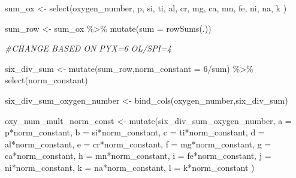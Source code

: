 \documentclass[
]{article}
\newenvironment{Shaded}{\begin{snugshade}}{\end{snugshade}}
\newcommand{\AttributeTok}[1]{\textcolor[rgb]{0.77,0.63,0.00}{#1}}
\newcommand{\CommentTok}[1]{\textcolor[rgb]{0.56,0.35,0.01}{\textit{#1}}}
\newcommand{\DecValTok}[1]{\textcolor[rgb]{0.00,0.00,0.81}{#1}}
\newcommand{\FunctionTok}[1]{\textcolor[rgb]{0.00,0.00,0.00}{#1}}
\newcommand{\NormalTok}[1]{#1}
\newcommand{\OtherTok}[1]{\textcolor[rgb]{0.56,0.35,0.01}{#1}}
\newcommand{\SpecialCharTok}[1]{\textcolor[rgb]{0.00,0.00,0.00}{#1}}
\begin{document}
\begin{Shaded}
\begin{Highlighting}[]
\NormalTok{sum\_ox }\OtherTok{\textless{}{-}} \FunctionTok{select}\NormalTok{(oxygen\_number, p,}
\NormalTok{                   si,}
\NormalTok{                   ti,}
\NormalTok{                   al,}
\NormalTok{                   cr,}
\NormalTok{                   mg,}
\NormalTok{                   ca,}
\NormalTok{                   mn,}
\NormalTok{                   fe,}
\NormalTok{                   ni,}
\NormalTok{                   na,}
\NormalTok{                   k}
\NormalTok{                   )}

\NormalTok{sum\_row }\OtherTok{\textless{}{-}}\NormalTok{ sum\_ox }\SpecialCharTok{\%\textgreater{}\%} 
  \FunctionTok{mutate}\NormalTok{(}\AttributeTok{sum =} \FunctionTok{rowSums}\NormalTok{(.))}

\CommentTok{\#CHANGE BASED ON PYX=6 OL/SPI=4}

\NormalTok{six\_div\_sum }\OtherTok{\textless{}{-}} \FunctionTok{mutate}\NormalTok{(sum\_row,}\AttributeTok{norm\_constant =} \DecValTok{6}\SpecialCharTok{/}\NormalTok{sum) }\SpecialCharTok{\%\textgreater{}\%} 
  \FunctionTok{select}\NormalTok{(norm\_constant)}

\NormalTok{six\_div\_sum\_oxygen\_number }\OtherTok{\textless{}{-}} \FunctionTok{bind\_cols}\NormalTok{(oxygen\_number,six\_div\_sum)}

\NormalTok{oxy\_num\_mult\_norm\_const }\OtherTok{\textless{}{-}} \FunctionTok{mutate}\NormalTok{(six\_div\_sum\_oxygen\_number, }\AttributeTok{a =}\NormalTok{ p}\SpecialCharTok{*}\NormalTok{norm\_constant,}
                                  \AttributeTok{b =}\NormalTok{ si}\SpecialCharTok{*}\NormalTok{norm\_constant,}
                                  \AttributeTok{c =}\NormalTok{ ti}\SpecialCharTok{*}\NormalTok{norm\_constant,}
                                  \AttributeTok{d =}\NormalTok{ al}\SpecialCharTok{*}\NormalTok{norm\_constant,}
                                  \AttributeTok{e =}\NormalTok{ cr}\SpecialCharTok{*}\NormalTok{norm\_constant,}
                                  \AttributeTok{f =}\NormalTok{ mg}\SpecialCharTok{*}\NormalTok{norm\_constant,}
                                  \AttributeTok{g =}\NormalTok{ ca}\SpecialCharTok{*}\NormalTok{norm\_constant,}
                                  \AttributeTok{h =}\NormalTok{ mn}\SpecialCharTok{*}\NormalTok{norm\_constant,}
                                  \AttributeTok{i =}\NormalTok{ fe}\SpecialCharTok{*}\NormalTok{norm\_constant,}
                                  \AttributeTok{j =}\NormalTok{ ni}\SpecialCharTok{*}\NormalTok{norm\_constant,}
                                  \AttributeTok{k =}\NormalTok{ na}\SpecialCharTok{*}\NormalTok{norm\_constant,}
                                  \AttributeTok{l =}\NormalTok{ k}\SpecialCharTok{*}\NormalTok{norm\_constant}
\NormalTok{                                  )}


\end{Highlighting}
\end{Shaded}
\end{document}
